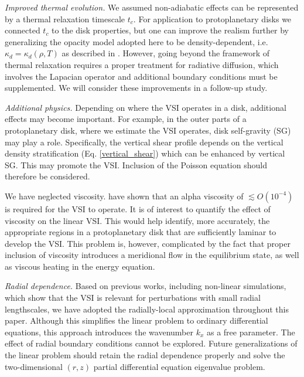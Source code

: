 \emph{Improved thermal evolution.} We assumed non-adiabatic effects
can be represented by a thermal relaxation timescale $t_c$. For 
application to protoplanetary disks we connected $t_c$ to the disk
properties, but one can improve the realism further by generalizing the
opacity model adopted here to be density-dependent,  i.e. $\kappa_d =
\kappa_d(\rho, T)$ as described in \cite{bell94}. %
However, going beyond the framework of thermal
relaxation requires a proper treatment for radiative diffusion, which
involves the Lapacian operator and additional boundary conditions
must be supplemented. We will consider these improvements in a
follow-up study. 
 
\emph{Additional physics.} Depending on where the VSI operates in a
disk, additional effects may become important. For example, in the
outer parts of a protoplanetary disk, where we estimate the VSI 
operates, disk self-gravity (SG) may play a role. Specifically, the vertical
shear profile depends on the vertical density stratification
(Eq. \ref{vertical_shear}) which can be enhanced by vertical SG. This
may promote the VSI. Inclusion of the Poisson equation should
therefore be considered.  

We have neglected viscosity. \cite{nelson13} have shown that an
alpha viscosity of $\lesssim O(10^{-4})$ is required for the VSI to
operate. It is of interest to quantify the effect of viscosity
on the linear VSI. This would help identify, more accurately, the
appropriate regions in a protoplanetary disk that are sufficiently
laminar to develop the VSI.  This problem is, however, complicated by
the fact that proper inclusion of viscosity introduces a meridional
flow in the equilibrium state, as well as viscous heating
in the energy equation. 


\emph{Radial dependence.} Based on previous works, including
non-linear simulations, which show that the VSI is relevant for
perturbations with small radial lengthscales, we have adopted the
radially-local approximation throughout this paper.  Although this
simplifies the linear problem to ordinary differential equations, this
approach introduces the wavenumber $k_x$ as a free parameter. The
effect of radial boundary conditions cannot be explored. Future 
generalizations of the linear problem should retain the radial
dependence properly and solve the two-dimensional $(r,z)$ partial 
differential equation eigenvalue problem. 



